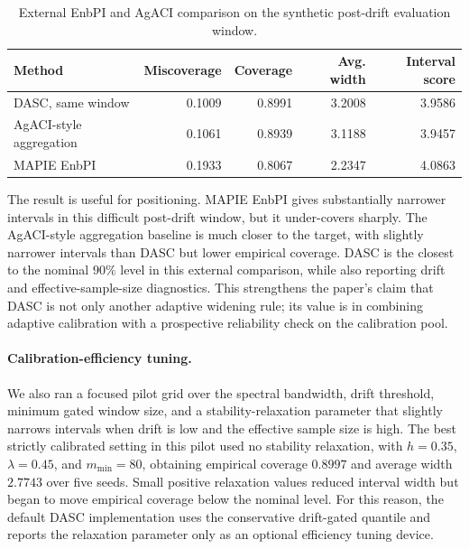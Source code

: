 \documentclass[11pt]{article}
\begin{document}
\begin{table}[t]
\centering
\caption{External EnbPI and AgACI comparison on the synthetic post-drift evaluation window.}
\label{tab:external-enbpi-agaci}
\begin{tabular}{lrrrr}
\toprule
Method & Miscoverage & Coverage & Avg. width & Interval score \\
\midrule
DASC, same window & 0.1009 & 0.8991 & 3.2008 & 3.9586 \\
AgACI-style aggregation & 0.1061 & 0.8939 & 3.1188 & 3.9457 \\
MAPIE EnbPI & 0.1933 & 0.8067 & 2.2347 & 4.0863 \\
\bottomrule
\end{tabular}
\end{table}

The result is useful for positioning. MAPIE EnbPI gives substantially narrower intervals in this difficult post-drift window, but it under-covers sharply. The AgACI-style aggregation baseline is much closer to the target, with slightly narrower intervals than DASC but lower empirical coverage. DASC is the closest to the nominal $90\%$ level in this external comparison, while also reporting drift and effective-sample-size diagnostics. This strengthens the paper's claim that DASC is not only another adaptive widening rule; its value is in combining adaptive calibration with a prospective reliability check on the calibration pool.

\paragraph{Calibration-efficiency tuning.}
We also ran a focused pilot grid over the spectral bandwidth, drift threshold, minimum gated window size, and a stability-relaxation parameter that slightly narrows intervals when drift is low and the effective sample size is high. The best strictly calibrated setting in this pilot used no stability relaxation, with $h=0.35$, $\lambda=0.45$, and $m_{\min}=80$, obtaining empirical coverage $0.8997$ and average width $2.7743$ over five seeds. Small positive relaxation values reduced interval width but began to move empirical coverage below the nominal level. For this reason, the default DASC implementation uses the conservative drift-gated quantile and reports the relaxation parameter only as an optional efficiency tuning device.
\end{document}
